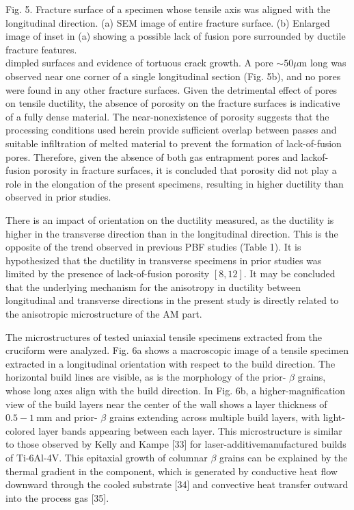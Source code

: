 \documentclass[10pt]{article}
\begin{document}
Fig. 5. Fracture surface of a specimen whose tensile axis was aligned with the longitudinal direction. (a) SEM image of entire fracture surface. (b) Enlarged image of inset in (a) showing a possible lack of fusion pore surrounded by ductile fracture features.\\
dimpled surfaces and evidence of tortuous crack growth. A pore $\sim 50 \mu \mathrm{m}$ long was observed near one corner of a single longitudinal section (Fig. 5b), and no pores were found in any other fracture surfaces. Given the detrimental effect of pores on tensile ductility, the absence of porosity on the fracture surfaces is indicative of a fully dense material. The near-nonexistence of porosity suggests that the processing conditions used herein provide sufficient overlap between passes and suitable infiltration of melted material to prevent the formation of lack-of-fusion pores. Therefore, given the absence of both gas entrapment pores and lackof-fusion porosity in fracture surfaces, it is concluded that porosity did not play a role in the elongation of the present specimens, resulting in higher ductility than observed in prior studies.

There is an impact of orientation on the ductility measured, as the ductility is higher in the transverse direction than in the longitudinal direction. This is the opposite of the trend observed in previous PBF studies (Table 1). It is hypothesized that the ductility in transverse specimens in prior studies was limited by the presence of lack-of-fusion porosity $[8,12]$. It may be concluded that the underlying mechanism for the anisotropy in ductility between longitudinal and transverse directions in the present study is directly related to the anisotropic microstructure of the AM part.

The microstructures of tested uniaxial tensile specimens extracted from the cruciform were analyzed. Fig. 6a shows a macroscopic image of a tensile specimen extracted in a longitudinal orientation with respect to the build direction. The horizontal build lines are visible, as is the morphology of the prior- $\beta$ grains, whose long axes align with the build direction. In Fig. 6b, a higher-magnification view of the build layers near the center of the wall shows a layer thickness of $0.5-1 \mathrm{~mm}$ and prior- $\beta$ grains extending across multiple build layers, with light-colored layer bands appearing between each layer. This microstructure is similar to those observed by Kelly and Kampe [33] for laser-additivemanufactured builds of Ti-6Al-4V. This epitaxial growth of columnar $\beta$ grains can be explained by the thermal gradient in the component, which is generated by conductive heat flow downward through the cooled substrate [34] and convective heat transfer outward into the process gas [35].
\end{document}
